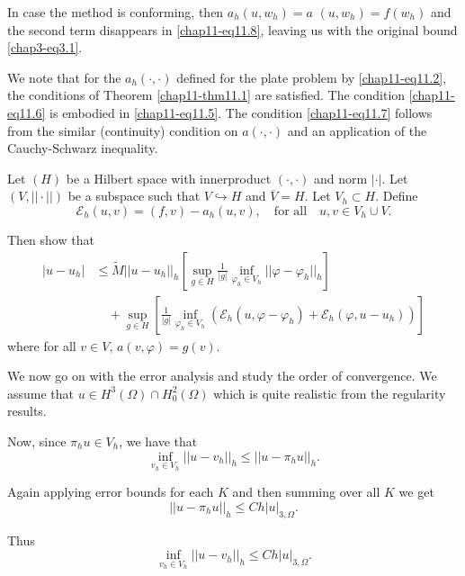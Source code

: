 \begin{remark}\label{chap11-rem11.2}
In case the method is conforming, then
$a_{h}(u,w_{h})= a$ $(u,w_{h})=f(w_{h})$ and the second term disappears in
\eqref{chap11-eq11.8}, leaving us with the original bound
\eqref{chap3-eq3.1}. 
\end{remark}

We note that for the $a_{h}(\cdot,\cdot)$ defined for the plate
problem by \eqref{chap11-eq11.2}, the conditions of Theorem
\ref{chap11-thm11.1} are satisfied. The condition
\eqref{chap11-eq11.6} is embodied in \eqref{chap11-eq11.5}. The
condition \eqref{chap11-eq11.7} follows from the similar (continuity)
condition on $a(\cdot,\cdot)$ and an application of the Cauchy-Schwarz
inequality. 

\begin{exercise}\label{chap11-exer11.2}
Let $(H)$ be a Hilbert space with innerproduct $(\cdot,\cdot)$ and
norm $|\cdot|$. Let $(V,||\cdot||)$ be a subspace such that
$V\hookrightarrow H$ and $\overline{V}=H$. Let $V_{h}\subset
H$. Define
$$
\mathscr{E}_{h}(u,v)=(f,v)-a_{h}(u,v),\quad\text{for all}\quad u,v\in
V_{h}\cup V.
$$

Then show that
\begin{align*}
|u-u_{h}|&\leq \widetilde{M}||u-u_{h}||_{h}\left[\sup\limits_{g\in
    H}\frac{1}{|g|}\inf\limits_{\varphi_{h}\in
    V_{h}}||\varphi-\varphi_{h}||_{h}\right]\\ 
&\quad +\sup\limits_{g\in
  H}\left[\frac{1}{|g|}\inf\limits_{\varphi_{h}\in
    V_{h}}(\mathscr{E}_{h}(u,\varphi-\varphi_{h})+\mathscr{E}_{h}(\varphi,u-u_{h}))\right] 
\end{align*}
where for all $v\in V$, $a(v,\varphi)=g(v)$. 
\end{exercise}

We now go on with the error analysis and study the order of
convergence. We assume that $u\in H^{3}(\Omega)\cap H^{2}_{0}(\Omega)$
which is quite realistic from the regularity results.

Now, since $\pi_{h}u\in V_{h}$, we have that 
$$
\inf\limits_{v_{h}\in V_{h}}||u-v_{h}||_{h}\leq ||u-\pi_{h}u||_{h}.
$$\pageoriginale

Again applying error bounds for each $K$ and then summing over all $K$
we get
$$
||u-\pi_{h}u||_{h}\leq Ch|u|_{3,\Omega}.
$$

Thus
\begin{equation*}
\inf\limits_{v_{h}\in V_{h}}||u-v_{h}||_{h}\leq
Ch|u|_{3,\Omega}.\tag{11.10}\label{chap11-eq11.10} 
\end{equation*}

